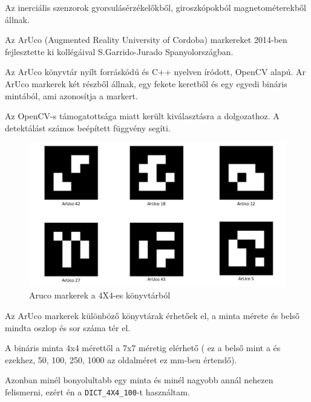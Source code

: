 Az inerciális szenzorok gyorsulásérzékelőkből, giroszkópokból magnetométerekből állnak.


Az ArUco (Augmented Reality University of Cordoba) markereket 2014-ben fejlesztette ki kollégáival S.Garrido-Jurado Spanyolországban. 

Az ArUco könyvtár nyílt forráskódú és C++ nyelven íródott, OpenCV alapú. 
Ar ArUco markerek két részből állnak, egy fekete keretből és egy egyedi bináris mintából, ami azonosítja a markert.

Az OpenCV-s támogatottsága miatt került kiválasztásra a dolgozathoz. A detektálást számos beépített függvény segíti.\\

\begin{figure}[htp]
    \centering
   	\includegraphics[width=4.8truecm, height=3truecm]{images/kep.png}
	\caption{Aruco markerek a 4X4-es könyvtárból}
\end{figure}


Az ArUco markerek különböző könyvtárak érhetőek el, a minta mérete és belső mindta oszlop és sor száma tér el.

A bináris minta  4x4 mérettől a 7x7 méretig elérhető ( ez a belső mint a és ezekhez, 50, 100, 250, 1000 az oldalméret ez mm-ben értendő).

Azonban minél bonyolultabb egy minta és minél nagyobb annál nehezen felismerni, ezért én a  \texttt{DICT\_4X4\_100}-t használtam.



